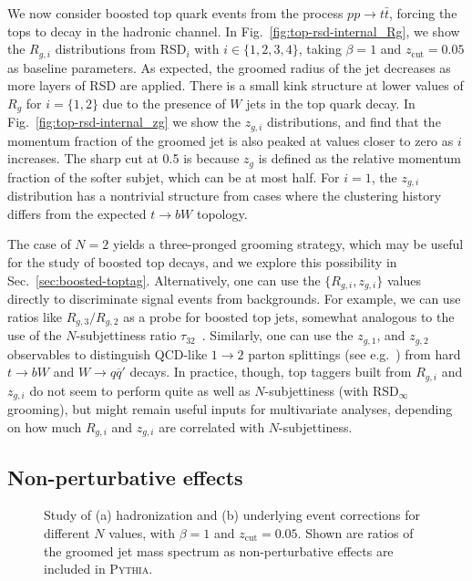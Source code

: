 \documentclass[11pt,a4paper]{article}
\newcommand{\zcut}{z_\text{cut}}
\DeclareRobustCommand{\Sec}[1]{Sec.~\ref{#1}}
\DeclareRobustCommand{\Fig}[1]{Fig.~\ref{#1}}
\begin{document}
We now consider boosted top quark events from the process $pp\rightarrow t\bar{t}$, forcing the tops to decay in the hadronic channel.
%
In \Fig{fig:top-rsd-internal_Rg}, we show the $R_{g,i}$ distributions from RSD$_i$ with $i \in \{1,2,3,4\}$, taking $\beta = 1$ and  $\zcut = 0.05$ as baseline parameters. 
%
As expected, the groomed radius of the jet decreases as more layers of RSD are applied.
%
There is a small kink structure at lower values of $R_g$ for $i=\{1,2\}$ due to the presence of
$W$ jets in the top quark decay.
%
In \Fig{fig:top-rsd-internal_zg} we show the $z_{g,i}$ distributions, and find that the momentum
fraction of the groomed jet is also peaked at values closer to zero as $i$ increases.
%
The sharp cut at 0.5 is because $z_g$ is defined as the relative momentum fraction of the softer subjet, which can be at most half.
%
For $i=1$, the $z_{g,i}$ distribution has a nontrivial structure from cases where the clustering history differs from the expected $t \to b W$ topology.

The case of $N = 2$ yields a three-pronged grooming strategy, which may be useful for the study of boosted top
decays, and we explore this possibility in \Sec{sec:boosted-toptag}.
%
Alternatively, one can use the $\{R_{g,i}, z_{g,i} \}$ values directly to discriminate
signal events from backgrounds.
%
For example, we can use ratios like $R_{g,3}/R_{g,2}$ as a probe for boosted top jets, somewhat analogous to the use of the
$N$-subjettiness ratio $\tau_{32}$~\cite{Thaler:2010tr,Thaler:2011gf}.
%
Similarly, one can use the $z_{g,1}$, and $z_{g,2}$ observables to distinguish QCD-like $1\rightarrow 2$ parton splittings (see e.g.~\cite{Larkoski:2017bvj}) from hard $t \to bW$ and $W \to q \overline{q}'$ decays.
%
In practice, though, top taggers built from $R_{g,i}$ and $z_{g,i}$ do
not seem to perform quite as well as $N$-subjettiness (with
RSD${}_\infty$ grooming), but might remain useful inputs for
multivariate analyses, depending on how much $R_{g,i}$ and $z_{g,i}$ are correlated with $N$-subjettiness.

\subsection{Non-perturbative effects}
\label{sec:NP-effects}

\begin{figure}[t]
  \centering
  \qquad
  \caption{Study of (a) hadronization and (b) underlying event corrections for different $N$ values, with $\beta = 1$ and $\zcut = 0.05$.  Shown are ratios of the groomed jet mass spectrum as non-perturbative effects are included in \textsc{Pythia}.}
  \label{fig:m_NP}
\end{figure}
\end{document}
